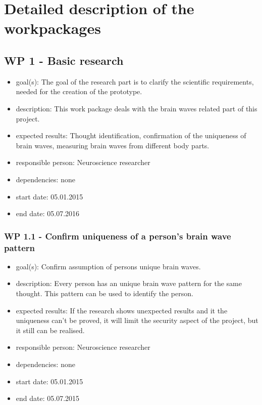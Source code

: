 \section{Detailed description of the workpackages}
\label{sect:workplan}

\subsection*{WP 1 - Basic research}
\begin{itemize}
 \item goal(s): The goal of the research part is to clarify the scientific requirements, needed for the creation of the prototype.
 \item description: This work package deals with the brain waves related part of this project.
 \item expected results: Thought identification, confirmation of the uniqueness of brain waves, measuring brain waves from different body parts.
 \item responsible person: Neuroscience researcher
 \item dependencies: none
 \item start date: 05.01.2015
 \item end date: 05.07.2016
\end{itemize}

\subsubsection*{WP 1.1 - Confirm uniqueness of a person’s brain wave pattern}
\begin{itemize}
 \item goal(s): Confirm assumption of persons unique brain waves.
 \item description: Every person has an unique brain wave pattern for the same thought. This pattern can be used to identify the person.
 \item expected results: If the research shows unexpected results and it the uniqueness can’t be proved, it will limit the security aspect of the project, but it still can be realised.
 \item responsible person: Neuroscience researcher
 \item dependencies: none
 \item start date: 05.01.2015
 \item end date: 05.07.2015
\end{itemize}

